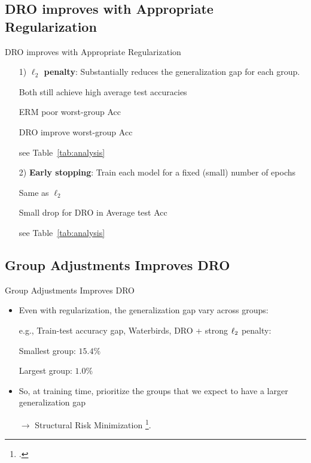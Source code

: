 \documentclass{beamer}
\begin{document}
\subsection{DRO improves with Appropriate Regularization}
\begin{viterbiframe}{DRO improves with Appropriate Regularization}
    \begin{itemize}
        \item[1)] {\bf $\ell_2$ penalty}: Substantially reduces the \alert{generalization gap} for each group.
        
        Both still achieve high average test accuracies
        
        ERM poor worst-group Acc
        
        DRO improve worst-group Acc
        
        see Table~\ref{tab:analysis}
        
        \pause
        \item[2)] {\bf Early stopping}: Train each model for a \alert{fixed (small) number of epochs}
        
        Same as $\ell_2$
        
        Small \alert{drop} for DRO in Average test Acc
        
        see Table~\ref{tab:analysis}
    \end{itemize}
\end{viterbiframe}

\subsection{Group Adjustments Improves DRO}

\begin{viterbiframe}{Group Adjustments Improves DRO}
    
    \begin{itemize}
    \item
        Even with regularization, the \alert{generalization gap} vary across groups: 
        
        e.g., \alert{Train-test accuracy gap}, Waterbirds, DRO + strong $\ell_2$ penalty: 
        
        Smallest group: $15.4\%$ 
        
        Largest group: $1.0\%$
        
        \pause
        \item So, at training time, \alert{prioritize} the groups that we \alert{expect to have a larger generalization gap}
        
        $\rightarrow$  Structural Risk Minimization \footcite{vapnik1992principles}.
    
    \end{itemize}
\end{viterbiframe}
\end{document}
